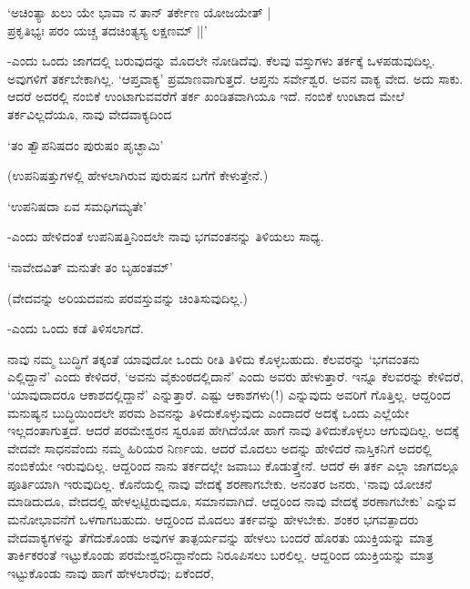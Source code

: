 \begin{shloka}
`ಅಚಿಂತ್ಯಾ ಖಲು ಯೇ ಭಾವಾ ನ ತಾನ್ ತರ್ಕೇಣ ಯೋಜಯೇತ್ |\\
ಪ್ರಕೃತಿಭ್ಯಃ ಪರಂ ಯಚ್ಚ ತದಚಿಂತ್ಯಸ್ಯ ಲಕ್ಷಣಮ್ ||'
\end{shloka}

-ಎಂದು ಒಂದು ಜಾಗದಲ್ಲಿ ಬರುವುದನ್ನು ಮೊದಲೇ ನೋಡಿದೆವು. ಕೆಲವು ವಸ್ತುಗಳು ತರ್ಕಕ್ಕೆ ಒಳಪಡುವುದಿಲ್ಲ. ಅವುಗಳಿಗೆ ತರ್ಕಬೇಕಾಗಿಲ್ಲ. `ಆಪ್ತವಾಕ್ಯ' ಪ್ರಮಾಣವಾಗುತ್ತದೆ. ಆಪ್ತನು ಸರ್ವೇಶ್ವರ. ಅವನ ವಾಕ್ಯ ವೇದ. ಅದು ಸಾಕು. ಆದರೆ ಅದರಲ್ಲಿ ನಂಬಿಕೆ ಉಂಟಾಗುವವರೆಗೆ ತರ್ಕ ಖಂಡಿತವಾಗಿಯೂ ಇದೆ. ನಂಬಿಕೆ ಉಂಟಾದ ಮೇಲೆ ತರ್ಕವಿಲ್ಲದೆಯೂ, ನಾವು ವೇದವಾಕ್ಯದಿಂದ

\begin{shloka}
`ತಂ ತ್ವೌಪನಿಷದಂ ಪುರುಷಂ ಪೃಚ್ಛಾಮಿ'
\end{shloka}

(ಉಪನಿಷತ್ತುಗಳಲ್ಲಿ ಹೇಳಲಾಗಿರುವ ಪುರುಷನ ಬಗೆಗೆ ಕೇಳುತ್ತೇನೆ.)

\begin{shloka}
`ಉಪನಿಷದಾ ಏವ ಸಮಧಿಗಮ್ಯತೇ'
\end{shloka}

-ಎಂದು ಹೇಳಿದಂತೆ ಉಪನಿಷತ್ತಿನಿಂದಲೇ ನಾವು ಭಗವಂತನನ್ನು ತಿಳಿಯಲು ಸಾಧ್ಯ.

\begin{shloka}
`ನಾವೇದವಿತ್ ಮನುತೇ ತಂ ಬೃಹಂತಮ್'
\end{shloka}

(ವೇದವನ್ನು ಅರಿಯದವನು ಪರವಸ್ತುವನ್ನು ಚಿಂತಿಸುವುದಿಲ್ಲ.)

-ಎಂದು ಒಂದು ಕಡೆ ತಿಳಿಸಲಾಗದೆ.

ನಾವು ನಮ್ಮ ಬುದ್ಧಿಗೆ ತಕ್ಕಂತೆ ಯಾವುದೋ ಒಂದು ರೀತಿ ತಿಳಿದು ಕೊಳ್ಳಬಹುದು. ಕೆಲವರನ್ನು `ಭಗವಂತನು ಎಲ್ಲಿದ್ದಾನೆ' ಎಂದು ಕೇಳಿದರೆ, `ಅವನು ವೈಕುಂಠದಲ್ಲಿದಾನೆ' ಎಂದು ಅವರು ಹೇಳುತ್ತಾರೆ. ಇನ್ನೂ ಕೆಲವರನ್ನು ಕೇಳಿದರೆ, `ಯಾವುದಾದರೂ ಆಕಾಶದಲ್ಲಿದ್ದಾನೆ' ಎನ್ನುತ್ತಾರೆ. ಎಷ್ಟು ಆಕಾಶಗಳು(!) ಎನ್ನುವುದು ಅವರಿಗೆ ಗೊತ್ತಿಲ್ಲ. ಆದ್ದರಿಂದ ಮನುಷ್ಯನ ಬುದ್ಧಿಯಿಂದಲೇ ಪರಮ ಶಿವನನ್ನು ತಿಳಿದುಕೊಳ್ಳುವುದು ಎಂದಾದರೆ ಅದಕ್ಕೆ ಒಂದು ಎಲ್ಲೆಯೇ ಇಲ್ಲದಂತಾಗುತ್ತದೆ. ಆದರೆ ಪರಮೇಶ್ವರನ ಸ್ವರೂಪ ಹೇಗಿದೆಯೋ ಹಾಗೆ ನಾವು ತಿಳಿದುಕೊಳ್ಳಲು ಆಗುವುದಿಲ್ಲ. ಅದಕ್ಕೆ ವೇದವೇ ಸಾಧನವೆಂದು ನಮ್ಮ ಹಿರಿಯರ ನಿರ್ಣಯ. ಆದರೆ ಮೊದಲು ಅದನ್ನು ಹೇಳಿದರೆ ನಾಸ್ತಿಕನಿಗೆ ಅದರಲ್ಲಿ ನಂಬಿಕೆಯೇ ಇರುವುದಿಲ್ಲ. ಆದ್ದರಿಂದ ನಾನು ತರ್ಕದಲ್ಲೇ ಜವಾಬು ಕೊಡುತ್ತ್ತೇನೆ. ಆದರೆ ಈ ತರ್ಕ ಎಲ್ಲಾ ಜಾಗದಲ್ಲೂ ಪೂರ್ತಿಯಾಗಿ ಇರುವುದಿಲ್ಲ. ಕೊನೆಯಲ್ಲಿ ನಾವು ವೇದಕ್ಕೆ ಶರಣಾಗಬೇಕು. ಅನಂತರ ಜನರು, `ನಾವು ಯೋಚನೆ ಮಾಡಿದುದೂ, ವೇದದಲ್ಲಿ ಹೇಳಲ್ಪಟ್ಟಿರುವುದೂ, ಸಮಾನವಾಗಿದೆ. ಆದ್ದರಿಂದ ನಾವು ವೇದಕ್ಕೆ ಶರಣಾಗಬೇಕು' ಎನ್ನುವ ಮನೋಭಾವನೆಗೆ ಒಳಗಾಗಬಹುದು. ಆದ್ದರಿಂದ ಮೊದಲು ತರ್ಕವನ್ನು ಹೇಳಬೇಕು. ಶಂಕರ ಭಗವತ್ಪಾದರು ವೇದವಾಕ್ಯಗಳನ್ನು ತೆಗೆದುಕೊಂಡು ಅವುಗಳ ತಾತ್ಪರ್ಯವನ್ನು ಹೇಳಲು ಬಂದರೆ ಹೊರತು ಯುಕ್ತಿಯನ್ನು ಮಾತ್ರ ತಾರ್ಕಿಕರಂತೆ ಇಟ್ಟುಕೊಂಡು ಪರಮೇಶ್ವರನಿದ್ದಾನೆಂದು ನಿರೂಪಿಸಲು ಬರಲಿಲ್ಲ. ಆದ್ದರಿಂದ ಯುಕ್ತಿಯನ್ನು ಮಾತ್ರ ಇಟ್ಟುಕೊಂಡು ನಾವು ಹಾಗೆ ಹೇಳಲಾರೆವು; ಏಕೆಂದರೆ, 

